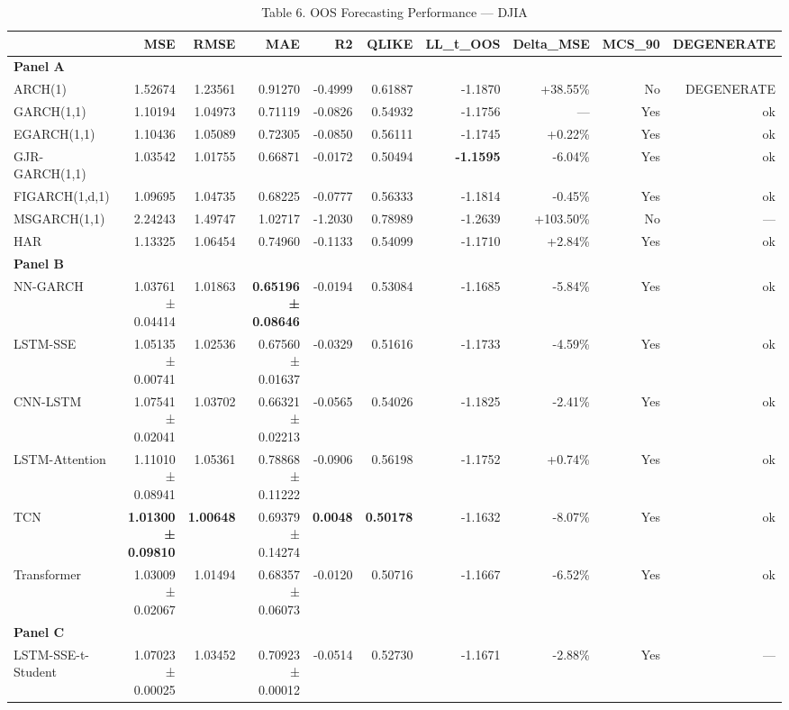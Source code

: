 \begin{table}[ht]
\centering
\caption{Table 6. OOS Forecasting Performance — DJIA}
\label{tab:oos_djia}
\begin{tabular}{lrrrrrrrrr}
\toprule
 & MSE & RMSE & MAE & R2 & QLIKE & LL_t_OOS & Delta_MSE & MCS_90 & DEGENERATE \\
\midrule
\multicolumn{10}{l}{\textbf{Panel A}} \\
ARCH(1) & 1.52674 & 1.23561 & 0.91270 & -0.4999 & 0.61887 & -1.1870 & +38.55\% & No & DEGENERATE \\
GARCH(1,1) & 1.10194 & 1.04973 & 0.71119 & -0.0826 & 0.54932 & -1.1756 & — & Yes & ok \\
EGARCH(1,1) & 1.10436 & 1.05089 & 0.72305 & -0.0850 & 0.56111 & -1.1745 & +0.22\% & Yes & ok \\
GJR-GARCH(1,1) & 1.03542 & 1.01755 & 0.66871 & -0.0172 & 0.50494 & \textbf{-1.1595} & -6.04\% & Yes & ok \\
FIGARCH(1,d,1) & 1.09695 & 1.04735 & 0.68225 & -0.0777 & 0.56333 & -1.1814 & -0.45\% & Yes & ok \\
MSGARCH(1,1) & 2.24243 & 1.49747 & 1.02717 & -1.2030 & 0.78989 & -1.2639 & +103.50\% & No & — \\
HAR & 1.13325 & 1.06454 & 0.74960 & -0.1133 & 0.54099 & -1.1710 & +2.84\% & Yes & ok \\
\multicolumn{10}{l}{\textbf{Panel B}} \\
NN-GARCH & 1.03761 ± 0.04414 & 1.01863 & \textbf{0.65196 ± 0.08646} & -0.0194 & 0.53084 & -1.1685 & -5.84\% & Yes & ok \\
LSTM-SSE & 1.05135 ± 0.00741 & 1.02536 & 0.67560 ± 0.01637 & -0.0329 & 0.51616 & -1.1733 & -4.59\% & Yes & ok \\
CNN-LSTM & 1.07541 ± 0.02041 & 1.03702 & 0.66321 ± 0.02213 & -0.0565 & 0.54026 & -1.1825 & -2.41\% & Yes & ok \\
LSTM-Attention & 1.11010 ± 0.08941 & 1.05361 & 0.78868 ± 0.11222 & -0.0906 & 0.56198 & -1.1752 & +0.74\% & Yes & ok \\
TCN & \textbf{1.01300 ± 0.09810} & \textbf{1.00648} & 0.69379 ± 0.14274 & \textbf{0.0048} & \textbf{0.50178} & -1.1632 & -8.07\% & Yes & ok \\
Transformer & 1.03009 ± 0.02067 & 1.01494 & 0.68357 ± 0.06073 & -0.0120 & 0.50716 & -1.1667 & -6.52\% & Yes & ok \\
\multicolumn{10}{l}{\textbf{Panel C}} \\
LSTM-SSE-t-Student & 1.07023 ± 0.00025 & 1.03452 & 0.70923 ± 0.00012 & -0.0514 & 0.52730 & -1.1671 & -2.88\% & Yes & — \\

\end{tabular}
\end{table}
